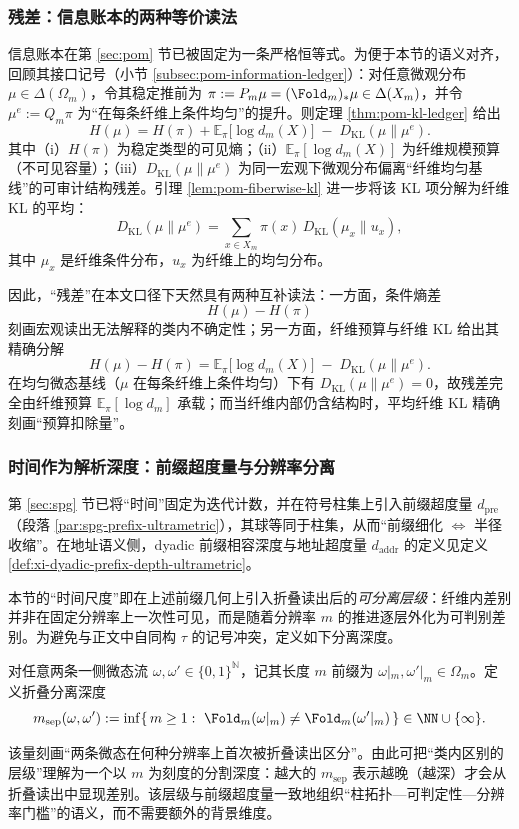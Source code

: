 \subsubsection{残差：信息账本的两种等价读法}\label{subsubsec:frt-residual-ledger}
信息账本在第 \ref{sec:pom} 节已被固定为一条严格恒等式。为便于本节的语义对齐，回顾其接口记号（小节 \ref{subsec:pom-information-ledger}）：对任意微观分布 \(\mu\in\Delta(\Omega_m)\)，令其稳定推前为 \(\pi:=P_m\mu=(\Fold_m)_*\mu\in\Delta(X_m)\)，并令 \(\mu^e:=Q_m\pi\) 为“在每条纤维上条件均匀”的提升。则定理 \ref{thm:pom-kl-ledger} 给出
\[
\boxed{\;
H(\mu)=H(\pi)+\mathbb{E}_{\pi}\!\bigl[\log d_m(X)\bigr]\;-\;D_{\mathrm{KL}}(\mu\|\mu^e).
\;}
\]
其中（i）\(H(\pi)\) 为稳定类型的可见熵；（ii）\(\mathbb{E}_{\pi}[\log d_m(X)]\) 为纤维规模预算（不可见容量）；（iii）\(D_{\mathrm{KL}}(\mu\|\mu^e)\) 为同一宏观下微观分布偏离“纤维均匀基线”的可审计结构残差。引理 \ref{lem:pom-fiberwise-kl} 进一步将该 KL 项分解为纤维 KL 的平均：
\[
D_{\mathrm{KL}}(\mu\|\mu^e)=\sum_{x\in X_m}\pi(x)\,D_{\mathrm{KL}}(\mu_x\|u_x),
\]
其中 \(\mu_x\) 是纤维条件分布，\(u_x\) 为纤维上的均匀分布。\par
因此，“残差”在本文口径下天然具有两种互补读法：一方面，条件熵差
\[
H(\mu)-H(\pi)
\]
刻画宏观读出无法解释的类内不确定性；另一方面，纤维预算与纤维 KL 给出其精确分解
\[
\boxed{\;
H(\mu)-H(\pi)=\mathbb{E}_{\pi}\!\bigl[\log d_m(X)\bigr]\;-\;D_{\mathrm{KL}}(\mu\|\mu^e).
\;}
\]
在均匀微态基线（\(\mu\) 在每条纤维上条件均匀）下有 \(D_{\mathrm{KL}}(\mu\|\mu^e)=0\)，故残差完全由纤维预算 \(\mathbb{E}_{\pi}[\log d_m]\) 承载；而当纤维内部仍含结构时，平均纤维 KL 精确刻画“预算扣除量”。

\subsubsection{时间作为解析深度：前缀超度量与分辨率分离}\label{subsubsec:frt-time-as-depth}
第 \ref{sec:spg} 节已将“时间”固定为迭代计数，并在符号柱集上引入前缀超度量 \(d_{\mathrm{pre}}\)（段落 \ref{par:spg-prefix-ultrametric}），其球等同于柱集，从而“前缀细化 \(\Leftrightarrow\) 半径收缩”。在地址语义侧，dyadic 前缀相容深度与地址超度量 \(d_{\mathrm{addr}}\) 的定义见定义 \ref{def:xi-dyadic-prefix-depth-ultrametric}。\par
本节的“时间尺度”即在上述前缀几何上引入折叠读出后的\emph{可分离层级}：纤维内差别并非在固定分辨率上一次性可见，而是随着分辨率 \(m\) 的推进逐层外化为可判别差别。为避免与正文中自同构 \(\tau\) 的记号冲突，定义如下分离深度。
\begin{definition}[折叠分离深度]\label{def:frt-fold-separation-depth}
对任意两条一侧微态流 \(\omega,\omega'\in\{0,1\}^{\mathbb{N}}\)，记其长度 \(m\) 前缀为 \(\omega|_m,\omega'|_m\in\Omega_m\)。定义折叠分离深度
\[
m_{\mathrm{sep}}(\omega,\omega')
:=\inf\{\,m\ge 1:\ \Fold_m(\omega|_m)\ne \Fold_m(\omega'|_m)\,\}\in\NN\cup\{\infty\}.
\]
\end{definition}
该量刻画“两条微态在何种分辨率上首次被折叠读出区分”。由此可把“类内区别的层级”理解为一个以 \(m\) 为刻度的分割深度：越大的 \(m_{\mathrm{sep}}\) 表示越晚（越深）才会从折叠读出中显现差别。该层级与前缀超度量一致地组织“柱拓扑—可判定性—分辨率门槛”的语义，而不需要额外的背景维度。

